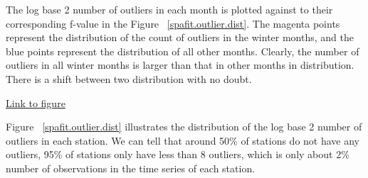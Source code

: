 The log base 2 number of outliers in each month is plotted against to their 
corresponding f-value in the Figure~
\href{../plots/a1950/spafit/d2/span0.015/a1950.outliersCountbystation.pdf}
{\ref*{spafit.outlier.dist}}.
The magenta points represent the distribution of the count of outliers in the 
winter months, and the blue points represent the distribution of all other months. 
Clearly, the number of outliers in all winter months is larger than that in other
months in distribution. There is a shift between two distribution with no doubt.

\begin{framed}
\begin{center}
  \href{../plots/a1950/spafit/d2/span0.015/a1950.outliersCountbystation.pdf}
  {Link to figure}
  \label{spafit.outlier.stat}
\end{center}
\end{framed}

Figure~
\href{../plots/a1950/spafit/d2/span0.015/a1950.outliersCountbystation.pdf}
{\ref*{spafit.outlier.dist}} illustrates the distribution of the log base 2 
number of outliers in each station. We can tell that around 50\% of stations do
not have any outliers, 95\% of stations only have less than 8 outliers, which is 
only about 2\% number of observations in the time series of each station.